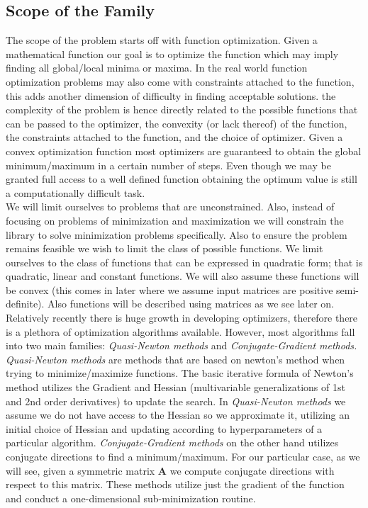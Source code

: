 \documentclass[12pt]{article}
\begin{document}
\subsection{Scope of the Family} 
The scope of the problem starts off with function optimization. Given a mathematical function our goal is to optimize the function which may imply finding all global/local minima or maxima. In the real world function optimization problems may also come with constraints attached to the function, this adds another dimension of difficulty in finding acceptable solutions. the complexity of the problem is hence directly related to the possible functions that can be passed to the optimizer, the convexity (or lack thereof) of the function, the constraints attached to the function, and the choice of optimizer. Given a convex optimization function most optimizers are guaranteed to obtain the global minimum/maximum in a certain number of steps. Even though we may be granted full access to a well defined function obtaining the optimum value is still a computationally difficult task.
\\

We will limit ourselves to problems that are unconstrained. Also, instead of focusing on problems of minimization and maximization we will constrain the library to solve minimization problems specifically. Also to ensure the problem remains feasible we wish to limit the class of possible functions. We limit ourselves to the class of functions that can be expressed in quadratic form; that is quadratic, linear and constant functions. We will also assume these functions will be convex (this comes in later where we assume input matrices are positive semi-definite). Also functions will be described using matrices as we see later on. 
\\

Relatively recently there is huge growth in developing optimizers, therefore there is a plethora of optimization algorithms available. However, most algorithms fall into two main families: \textit{Quasi-Newton methods} and \textit{Conjugate-Gradient methods.} \textit{Quasi-Newton methods} are methods that are based on newton's method when trying to minimize/maximize functions. The basic iterative formula of Newton's method utilizes the Gradient and Hessian (multivariable generalizations of 1st and 2nd order derivatives) to update the search. In \textit{Quasi-Newton methods} we assume we do not have access to the Hessian so we approximate it, utilizing an initial choice of Hessian and updating according to hyperparameters of a particular algorithm. \textit{Conjugate-Gradient methods} on the other hand utilizes conjugate directions to find a minimum/maximum. For our particular case, as we will see, given a symmetric matrix $\mathbf{A}$ we compute conjugate directions with respect to this matrix. These methods utilize just the gradient of the function and conduct a one-dimensional sub-minimization routine. 
\\
\end{document}
